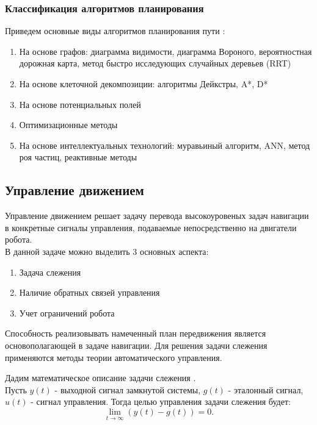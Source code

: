 \subsubsection{Классификация алгоритмов планирования}
Приведем основные виды алгоритмов планирования пути \cite{lavalle2006planning}:
\begin{enumerate}
    \item На основе графов: диаграмма видимости, диаграмма Вороного, вероятностная дорожная карта, метод быстро исследующих случайных деревьев (RRT)
    \item На основе клеточной декомпозиции: алгоритмы Дейкстры, A*, D*
    \item На основе потенциальных полей
    \item Оптимизационные методы
    \item На основе интеллектуальных технологий: муравьиный алгоритм, ANN, метод роя частиц, реактивные методы
\end{enumerate}

\subsection{Управление движением}
Управление движением решает задачу перевода высокоуровеных задач навигации в конкретные сигналы управления, подаваемые непосредственно на двигатели робота. \\
В данной задаче можно выделить 3 основных аспекта:
\begin{enumerate}
    \item Задача слежения
    \item Наличие обратных связей управления
    \item Учет ограничений робота
\end{enumerate}

Способность реализовывать намеченный план передвижения является основополагающей в задаче навигации. Для решения задачи слежения применяются методы теории автоматического управления.

Дадим математическое описание задачи слежения \cite{math-control-theory}. \\
Пусть $y(t)$ - выходной сигнал замкнутой системы, $g(t)$ - эталонный сигнал, $u(t)$ - сигнал управления. Тогда целью управления задачи слежения будет:
\begin{equation}
    \label{eq:e5}
    \lim _{t \rightarrow \infty} (y(t)-g(t)) = 0.
\end{equation}

